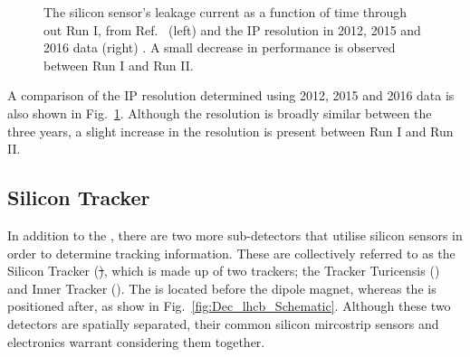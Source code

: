 \begin{figure}[!h]
\begin{subfigure}[m]{0.4\textwidth}
    \end{subfigure}
    \caption{The \velo silicon sensor's leakage current as a function of time through out Run I, from Ref.~\cite{Rinnert:2015uns} (left) and the \velo IP resolution in 2012, 2015 and 2016 data (right) . A small decrease in performance is observed between Run I and Run II.}
    \label{fig:Dec_velo_run2_performance}   
\end{figure}

A comparison of the IP resolution determined using 2012, 2015 and 2016 data is also shown in Fig.~\ref{fig:Dec_velo_run2_performance}. Although the resolution is broadly similar between the three years, a slight increase in the resolution is present between Run I and Run II. 









\subsection{Silicon Tracker}

In addition to the \velo, there are two more sub-detectors that utilise silicon sensors in order to determine tracking information. These are collectively referred to as the Silicon Tracker (\st), which is made up of two trackers; the Tracker Turicensis (\ttracker) and Inner Tracker (\intr). The \ttracker is located before the dipole magnet, whereas the \intr is positioned after, as show in Fig.~\ref{fig:Dec_lhcb_Schematic}. Although these two detectors are spatially separated, their common silicon mircostrip sensors and electronics warrant considering them together.

